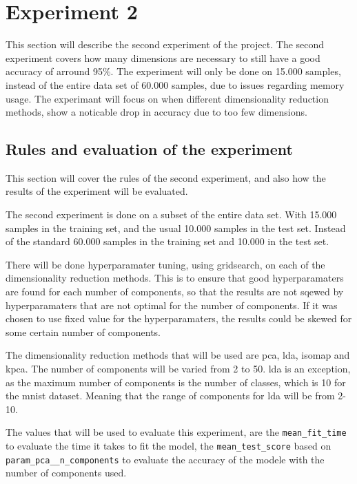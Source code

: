 \section{Experiment 2}\label{sec:experiment_2}
This section will describe the second experiment of the project. The second experiment covers how many dimensions are necessary to still have a good accuracy of arround 95\%. The experiment will only be done on 15.000 samples, instead of the entire data set of 60.000 samples, due to issues regarding memory usage. The experimant will focus on when different dimensionality reduction methods, show a noticable drop in accuracy due to too few dimensions. 


\subsection{Rules and evaluation of the experiment}\label{subsec:experiment_2_rules}
This section will cover the rules of the second experiment, and also how the results of the experiment will be evaluated.

The second experiment is done on a subset of the entire data set. With 15.000 samples in the training set, and the usual 10.000 samples in the test set. Instead of the standard 60.000 samples in the training set and 10.000 in the test set.

There will be done hyperparamater tuning, using gridsearch, on each of the dimensionality reduction methods. This is to ensure that good hyperparamaters are found for each number of components, so that the results are not sqewed by hyperparamaters that are not optimal for the number of components. If it was chosen to use fixed value for the hyperparamaters, the results could be skewed for some certain number of components.

The dimensionality reduction methods that will be used are \gls{pca}, \gls{lda}, \gls{isomap} and \gls{kpca}. The number of components will be varied from 2 to 50. \gls{lda} is an exception, as the maximum number of components is the number of classes, which is 10 for the \gls{mnist} dataset. Meaning that the range of components for \gls{lda} will be from 2-10.

The values that will be used to evaluate this experiment, are the \texttt{mean\_fit\_time} to evaluate the time it takes to fit the model, the \texttt{mean\_test\_score} based on \texttt{param\_pca\_\_n\_components} to evaluate the accuracy of the modele with the number of components used.

